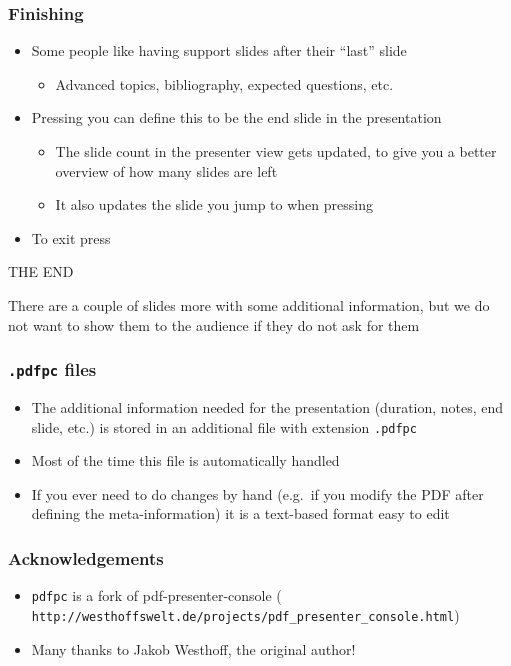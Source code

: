 \documentclass{beamer}
\newcommand{\singleitem}[1]{\begin{itemize}\item #1\end{itemize}}
\newcommand{\pdfpc}{\texttt{pdfpc}\xspace}
\newcommand{\opt}[1]{\texttt{#1}\xspace}
\begin{document}
\begin{frame}
  \frametitle{Finishing}
  \begin{itemize}
    \item Some people like having support slides after their ``last'' slide
      \singleitem{Advanced topics, bibliography, expected questions, etc.}
    \item Pressing  you can define this to be the end slide
      in the presentation
      \singleitem{The slide count in the presenter view gets updated, to give
        you a better overview of how many slides are left}
      \singleitem{It also updates the slide you jump to when pressing
        \keys{End}}
    \item To exit press 
  \end{itemize}
  \vfill
  \begin{center}
    THE END
  \end{center}
  \vfill
  {\footnotesize There are a couple of slides more with some additional
    information, but we do not want to show them to the audience if they do not
    ask for them}
\end{frame}

\begin{frame}
  \frametitle{\opt{.pdfpc} files}
  \begin{itemize}
    \item The additional information needed for the presentation (duration,
      notes, end slide, etc.) is stored in an additional file with extension
      \opt{.pdfpc}
    \item Most of the time this file is automatically handled
    \item If you ever need to do changes by hand (e.g.\ if you modify the PDF
      after defining the meta-information) it is a text-based format easy to
      edit
  \end{itemize}
\end{frame}

\begin{frame}[fragile]
  \frametitle{Acknowledgements}
  \begin{itemize}
    \item \pdfpc is a fork of pdf-presenter-console
      ({\footnotesize
        \verb+http://westhoffswelt.de/projects/pdf_presenter_console.html+})
    \item Many thanks to Jakob Westhoff, the original author!
  \end{itemize}
\end{frame}
\end{document}

